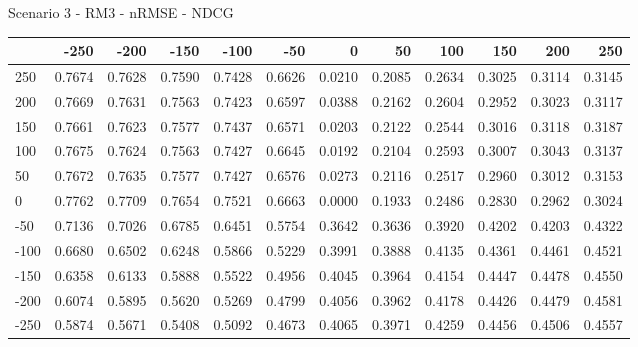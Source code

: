 Scenario 3 - RM3 - nRMSE - NDCG
\begin{tabular}{lrrrrrrrrrrr}
\toprule
{} &   -250 &   -200 &   -150 &   -100 &   -50  &    0   &    50  &    100 &    150 &    200 &    250 \\
\midrule
 250 & 0.7674 & 0.7628 & 0.7590 & 0.7428 & 0.6626 & 0.0210 & 0.2085 & 0.2634 & 0.3025 & 0.3114 & 0.3145 \\
 200 & 0.7669 & 0.7631 & 0.7563 & 0.7423 & 0.6597 & 0.0388 & 0.2162 & 0.2604 & 0.2952 & 0.3023 & 0.3117 \\
 150 & 0.7661 & 0.7623 & 0.7577 & 0.7437 & 0.6571 & 0.0203 & 0.2122 & 0.2544 & 0.3016 & 0.3118 & 0.3187 \\
 100 & 0.7675 & 0.7624 & 0.7563 & 0.7427 & 0.6645 & 0.0192 & 0.2104 & 0.2593 & 0.3007 & 0.3043 & 0.3137 \\
 50  & 0.7672 & 0.7635 & 0.7577 & 0.7427 & 0.6576 & 0.0273 & 0.2116 & 0.2517 & 0.2960 & 0.3012 & 0.3153 \\
 0   & 0.7762 & 0.7709 & 0.7654 & 0.7521 & 0.6663 & 0.0000 & 0.1933 & 0.2486 & 0.2830 & 0.2962 & 0.3024 \\
-50  & 0.7136 & 0.7026 & 0.6785 & 0.6451 & 0.5754 & 0.3642 & 0.3636 & 0.3920 & 0.4202 & 0.4203 & 0.4322 \\
-100 & 0.6680 & 0.6502 & 0.6248 & 0.5866 & 0.5229 & 0.3991 & 0.3888 & 0.4135 & 0.4361 & 0.4461 & 0.4521 \\
-150 & 0.6358 & 0.6133 & 0.5888 & 0.5522 & 0.4956 & 0.4045 & 0.3964 & 0.4154 & 0.4447 & 0.4478 & 0.4550 \\
-200 & 0.6074 & 0.5895 & 0.5620 & 0.5269 & 0.4799 & 0.4056 & 0.3962 & 0.4178 & 0.4426 & 0.4479 & 0.4581 \\
-250 & 0.5874 & 0.5671 & 0.5408 & 0.5092 & 0.4673 & 0.4065 & 0.3971 & 0.4259 & 0.4456 & 0.4506 & 0.4557 \\
\bottomrule
\end{tabular}

